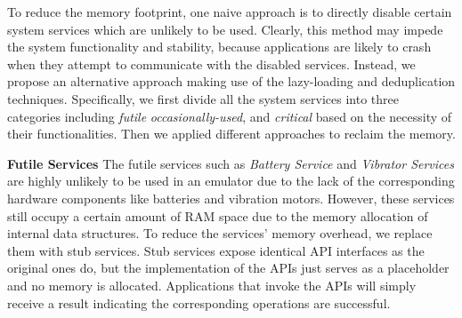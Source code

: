 \documentclass[conference]{IEEEtranl}
\begin{document}








	To reduce the memory footprint, one naive approach is to directly disable certain system services which are unlikely to be used. Clearly, this method may impede the system functionality and stability, because applications are likely to crash when they attempt to communicate with the disabled services. Instead, we propose an alternative approach making use of the lazy-loading and deduplication techniques. Specifically, we first divide all the system services into three categories including  \textit{futile} \textit{occasionally-used}, and \textit{critical} based on the necessity of their functionalities. Then we applied different approaches to reclaim the memory.

	\textbf{Futile Services}
	The futile services such as \textit{Battery Service} and \textit{Vibrator Services} are highly unlikely to be used in an emulator due to the lack of the corresponding hardware components like batteries and vibration motors. However, these services still occupy a certain amount of RAM space due to the memory allocation of internal data structures. To reduce the services' memory overhead, we replace them with stub services. Stub services expose identical API interfaces as the original ones do, but the implementation of the APIs just serves as a placeholder and no memory is allocated. Applications that invoke the APIs will simply receive a result indicating the corresponding operations are successful.
\end{document}
